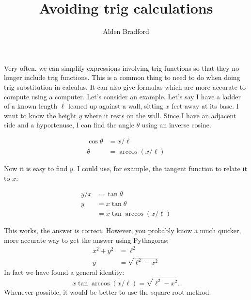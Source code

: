 \documentclass{article}
\title{Avoiding trig calculations}
\author{Alden Bradford}
\begin{document}
\maketitle

Very often, we can simplify expressions involving trig functions so that they no longer include trig functions. This is a common thing to need to do when doing trig substitution in calculus. It can also give formulas which are more accurate to compute using a computer. Let's consider an example. Let's say I have a ladder of a known length $\ell$ leaned up against a wall, sitting $x$ feet away at its base. I want to know the height $y$ where it rests on the wall. Since I have an adjacent side and a hyportenuse, I can find the angle $\theta$ using an inverse cosine.

\begin{figure}[h!]
\centering
{}
\end{figure}

\begin{align*}
\cos \theta &= x/\ell \\
\theta &= \arccos(x/\ell)
\end{align*}

Now it is easy to find $y$. I could use, for example, the tangent function to relate it to $x$:

\begin{align*}
y/x &= \tan \theta\\
y &= x \tan \theta\\
&= x\tan \arccos(x/\ell)
\end{align*}

This works, the answer is correct. However, you probably know a much quicker, more accurate way to get the answer using Pythagoras:
\begin{align*}
x^2 + y^2 &= \ell^2\\
y &= \sqrt{\ell^2 - x^2}
\end{align*}
In fact we have found a general identity:
\[  x\tan \arccos(x/\ell) = \sqrt{\ell^2 - x^2}. \]
Whenever possible, it would be better to use the square-root method.
\end{document}
